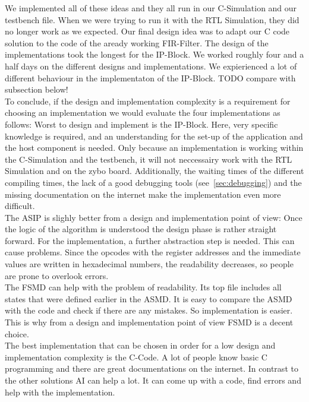 \documentclass[conference]{IEEEtran}
\begin{document}
We implemented all of these ideas and they all run in our C-Simulation and our testbench file. When we were trying to run it with the RTL Simulation, they did no longer work as we expected. Our final design idea was to adapt our C code solution to the code of the aready working FIR-Filter. The design of the implementations took the longest for the IP-Block. We worked roughly four and a half days on the different designs and implementations. We expierienced a lot of different behaviour in the implementaton of the IP-Block. TODO compare with subsection below!\\  
To conclude, if the design and implementation complexity is a requirement for choosing an implementation we would evaluate the four implementations as follows:
Worst to design and implement is the IP-Block. Here, very specific knowledge is required, and an understanding for the set-up of the application and the host component is needed. Only because an implementation is working within the C-Simulation and the testbench, it will not neccessairy work with the RTL Simulation and on the zybo board. Additionally, the waiting times of the different compiling times, the lack of a good debugging tools (see~\ref{sec:debugging}) and the missing documentation on the internet make the implementation even more difficult.\\
The ASIP is slighly better from a design and implementation point of view: Once the logic of the algorithm is understood the design phase is rather straight forward. For the implementation, a further abstraction step is needed. This can cause problems. Since the opcodes with the register addresses and the immediate values are written in hexadecimal numbers, the readability decreases, so people are prone to overlook errors.\\
The FSMD can help with the problem of readability. Its top file includes all states that were defined earlier in the ASMD. It is easy to compare the ASMD with the code and check if there are any mistakes. So implementation is easier. This is why from a design and implementation point of view FSMD is a decent choice.\\
The best implementation that can be chosen in order for a low design and implementation complexity is the C-Code. A lot of people know basic C programming and there are great documentations on the internet. In contrast to the other solutions AI can help a lot. It can come up with a code, find errors and help with the implementation.\\
\end{document}
